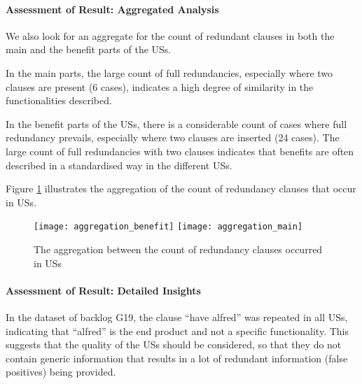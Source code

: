 \paragraph{Assessment of Result: Aggregated Analysis}We also look for an aggregate for the count of redundant clauses in both the main and the benefit parts of the USs. 

In the main parts, the large count of full redundancies, especially where two clauses are present (6 cases), indicates a high degree of similarity in the functionalities described.

In the benefit parts of the USs, there is a considerable count of cases where full redundancy prevails, especially where two clauses are inserted (24 cases). The large count of full redundancies with two clauses indicates that benefits are often described in a standardised way in the different USs.

Figure \ref{fig:aggregation} illustrates the aggregation of the count of redundancy clauses that occur in USs.

\begin{figure}[h]
	\centering
	\texttt{[image: aggregation\_benefit]}
	\texttt{[image: aggregation\_main]}
	\caption{The aggregation between the count of redundancy clauses occurred in USs}\label{fig:aggregation}
\end{figure}
\paragraph{Assessment of Result: Detailed Insights}In the dataset of backlog G19, the clause \enquote{have alfred} was repeated in all USs, indicating that \enquote{alfred} is the end product and not a specific functionality. This suggests that the quality of the USs should be considered, so that they do not contain generic information that results in a lot of redundant information (false positives) being provided.

